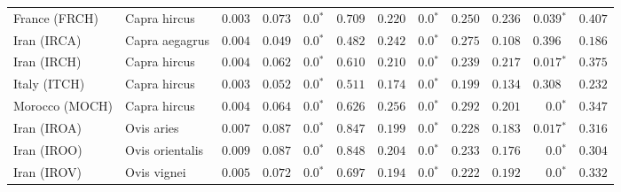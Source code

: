 \documentclass{article}
\begin{document}
\begin{table*}[!ht]
\begin{adjustbox}{width = 1\textwidth}
\begin{tabular}{||l|l|r||r|r|r||r|r|r||r|r|r||}
                \rowcolor{LIGHTGREY} France (FRCH)                  & Capra hircus        & $ 0.003$ & $ 0.073$ & $\bm{0.0{^*}}$                  & $ 0.709$                                                                     & $ 0.220$                      & $\bm{0.0{^*}}$ & $ 0.250$ & $ 0.236$ & $\bm{ 0.039{^*}}$ & $ 0.407$ \\
                \rowcolor{LIGHTGREY} Iran (IRCA)                    & Capra aegagrus      & $ 0.004$ & $ 0.049$ & $\bm{0.0{^*}}$                  & $ 0.482$                                                                     & $ 0.242$                      & $\bm{0.0{^*}}$ & $ 0.275$ & $ 0.108$ & $ 0.396~~$ & $ 0.186$ \\
                \rowcolor{LIGHTGREY} Iran (IRCH)                    & Capra hircus        & $ 0.004$ & $ 0.062$ & $\bm{0.0{^*}}$    & $ 0.610$                                                                     & $ 0.210$                      & $\bm{0.0{^*}}$ & $ 0.239$ & $ 0.217$ & $\bm{ 0.017{^*}}$ & $ 0.375$ \\
                \rowcolor{LIGHTGREY} Italy (ITCH)                   & Capra hircus        & $ 0.003$ & $ 0.052$ & $\bm{0.0{^*}}$    & $ 0.511$                                                                     & $ 0.174$                      & $\bm{0.0{^*}}$ & $ 0.199$ & $ 0.134$ & $ 0.308~~$ & $ 0.232$ \\
                \rowcolor{LIGHTGREY} Morocco (MOCH)                 & Capra hircus        & $ 0.004$ & $ 0.064$ & $\bm{0.0{^*}}$                  & $ 0.626$                                                                     & $ 0.256$                      & $\bm{0.0{^*}}$ & $ 0.292$ & $ 0.201$ & $\bm{0.0{^*}}$ & $ 0.347$ \\
                Iran (IROA)                                         & Ovis aries          & $ 0.007$ & $ 0.087$ & $\bm{0.0{^*}}$    & $ 0.847$ & $ 0.199$ & $\bm{0.0{^*}}$ & $ 0.228$ & $ 0.183$ & $\bm{ 0.017{^*}}$ & $ 0.316$ \\
                Iran (IROO)                                         & Ovis orientalis     & $ 0.009$ & $ 0.087$ & $\bm{0.0{^*}}$    & $ 0.848$ & $ 0.204$ & $\bm{0.0{^*}}$ & $ 0.233$ & $ 0.176$ & $\bm{0.0{^*}}$ & $ 0.304$ \\
                Iran (IROV)                                         & Ovis vignei         & $ 0.005$ & $ 0.072$ & $\bm{0.0{^*}}$    & $ 0.697$ & $ 0.194$ & $\bm{0.0{^*}}$ & $ 0.222$ & $ 0.192$ & $\bm{0.0{^*}}$ & $ 0.332$ \\

\end{tabular}
\end{adjustbox}
\end{table*}
\end{document}
